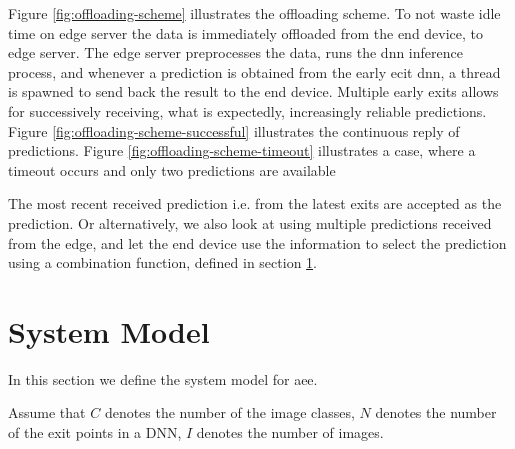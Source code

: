 Figure \ref{fig:offloading-scheme} illustrates the offloading scheme. To not waste idle time on edge server the data is immediately offloaded from the end device, to edge server. The edge server preprocesses the data, runs the \gls{dnn} inference process, and whenever a prediction is obtained from the early ecit \gls{dnn}, a thread is spawned to send back the result to the end device. Multiple early exits allows for successively receiving, what is expectedly, increasingly reliable predictions. Figure \ref{fig:offloading-scheme-successful} illustrates the continuous reply of predictions. Figure \ref{fig:offloading-scheme-timeout} illustrates a case, where a timeout occurs and only two predictions are available 

The most recent received prediction i.e. from the latest exits are accepted as the prediction. Or alternatively, we also look at using multiple predictions received from the edge, and let the end device use the information to select the prediction using a combination function, defined in section \ref{sec:edge-system-model}.

\section{System Model} \label{sec:edge-system-model}

In this section we define the system model for \gls{aee}. 

	
	Assume that $ C $ denotes the number of the image classes, $ N $ denotes the number of the exit points in a DNN, $ I $ denotes the number of images.
	
